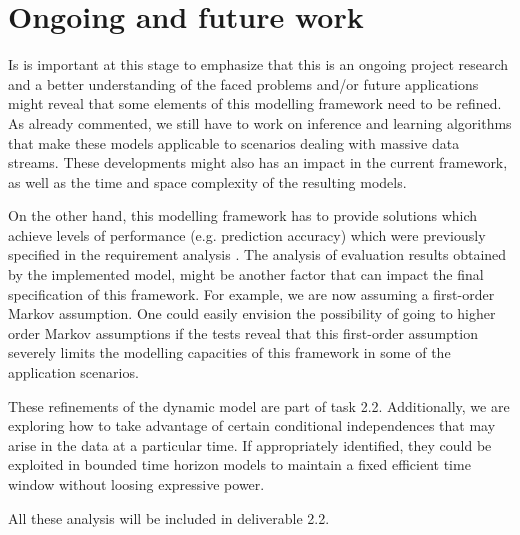 \section{Ongoing and future work}

Is is important at this stage to emphasize that this is an ongoing project research and a better understanding of the faced problems and/or future applications might reveal that some elements of this modelling framework need to be refined. As already commented,  we still have to work on inference and learning algorithms that make these models applicable to scenarios dealing with massive data streams. These developments might also has an impact in the current framework, as well as the time and space complexity of the resulting models.

On the other hand, this modelling framework has to provide solutions which achieve levels of performance (e.g. prediction accuracy) which were previously specified in the requirement analysis \cite{Fer14b}.  The analysis of evaluation results obtained by the implemented model, might be another factor that can impact the final specification of this framework. For example, we are now assuming a first-order Markov assumption. One could easily envision the possibility of going to higher order Markov assumptions if the tests reveal that this first-order assumption severely limits the modelling capacities of this framework in some of the application scenarios. 

These refinements of the dynamic model are part of task 2.2. Additionally, we are exploring how to take advantage of certain conditional independences that may arise in the data at a particular time. If appropriately identified, they could be exploited in bounded time horizon models to maintain a fixed efficient time window without loosing expressive power.

All these analysis will be included in deliverable 2.2.
